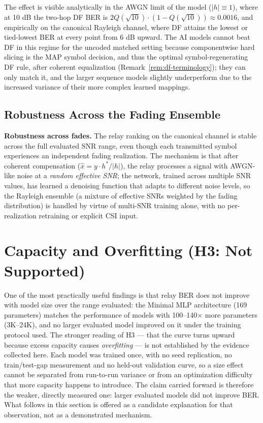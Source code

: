 The effect is visible analytically in the AWGN limit of the model ($|h|\equiv1$), where at 10 dB the two-hop DF BER is \(2Q(\sqrt{10}) \cdot (1 - Q(\sqrt{10})) \approx 0.0016\), and empirically on the canonical Rayleigh channel, where DF attains the lowest or tied-lowest BER at every point from 6 dB upward. The AI models cannot beat DF in this regime for the uncoded matched setting because componentwise hard slicing is the MAP symbol decision, and thus the optimal symbol-regenerating DF rule, after coherent equalization (Remark~\ref{rem:df-terminology}); they can only match it, and the larger sequence models slightly underperform due to the increased variance of their more complex learned mappings.

\subsection{Robustness Across the Fading Ensemble}\label{sec:channel-robustness}

\textbf{Robustness across fades.} The relay ranking on the canonical channel is stable across the full evaluated SNR range, even though each transmitted symbol experiences an independent fading realization. The mechanism is that after coherent compensation (\(\hat{x} = y \cdot h^*/|h|\)), the relay processes a signal with AWGN-like noise at a \emph{random effective SNR}; the network, trained across multiple SNR values, has learned a denoising function that adapts to different noise levels, so the Rayleigh ensemble (a mixture of effective SNRs weighted by the fading distribution) is handled by virtue of multi-SNR training alone, with no per-realization retraining or explicit CSI input.

\section{Capacity and Overfitting (H3: Not Supported)}\label{sec:capacity-and-overfitting}

One of the most practically useful findings is that relay BER does not improve with model size over the range evaluated: the Minimal MLP architecture (169 parameters) matches the performance of models with 100--140$\times$ more parameters (3K--24K), and no larger evaluated model improved on it under the training protocol used. The stronger reading of H3 --- that the curve turns upward because excess capacity causes \emph{overfitting} --- is not established by the evidence collected here. Each model was trained once, with no seed replication, no train/test-gap measurement and no held-out validation curve, so a size effect cannot be separated from run-to-run variance or from an optimization difficulty that more capacity happens to introduce. The claim carried forward is therefore the weaker, directly measured one: larger evaluated models did not improve BER. What follows in this section is offered as a candidate explanation for that observation, not as a demonstrated mechanism.

